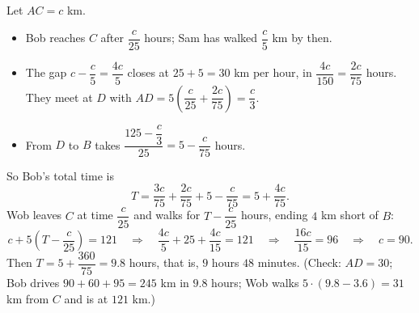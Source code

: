 Let $AC=c$ km.
\begin{itemize}
\item Bob reaches $C$ after $\dfrac{c}{25}$ hours; Sam has walked $\dfrac{c}{5}$ km by then.
\item The gap $c-\dfrac{c}{5}=\dfrac{4c}{5}$ closes at $25+5=30$ km per hour, in $\dfrac{4c}{150}=\dfrac{2c}{75}$ hours. They meet at $D$ with $AD=5\left(\dfrac{c}{25}+\dfrac{2c}{75}\right)=\dfrac{c}{3}$.
\item From $D$ to $B$ takes $\dfrac{125-\dfrac{c}{3}}{25}=5-\dfrac{c}{75}$ hours.
\end{itemize}
So Bob's total time is
\[
T=\dfrac{3c}{75}+\dfrac{2c}{75}+5-\dfrac{c}{75}=5+\dfrac{4c}{75}.
\]
Wob leaves $C$ at time $\dfrac{c}{25}$ and walks for $T-\dfrac{c}{25}$ hours, ending $4$ km short of $B$:
\[
c+5\left(T-\dfrac{c}{25}\right)=121\quad\Longrightarrow\quad\dfrac{4c}{5}+25+\dfrac{4c}{15}=121\quad\Longrightarrow\quad\dfrac{16c}{15}=96\quad\Longrightarrow\quad c=90 .
\]
Then $T=5+\dfrac{360}{75}=\boxed{9.8}$ hours, that is, $9$ hours $48$ minutes. (Check: $AD=30$; Bob drives $90+60+95=245$ km in $9.8$ hours; Wob walks $5\cdot(9.8-3.6)=31$ km from $C$ and is at $121$ km.)
